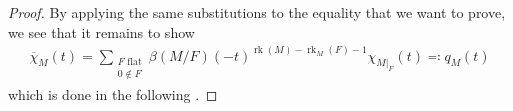 \documentclass[10pt,a4paper]{amsart}
\DeclareMathOperator{\rank}{rk}
\begin{document}
\begin{proof}
By applying the same substitutions to the equality that we want to prove, we see that it remains to show \begin{align*}
    \overline{\chi}_M(t)=\sum_{\substack{F \text{ flat} \\ 0\notin F}}\beta(M/F)(-t)^{\rank(M)-\rank_M(F)-1}\chi_{M|_F}(t) \eqcolon q_M(t)
\end{align*}
which is done in the following .
\end{proof}
\end{document}
